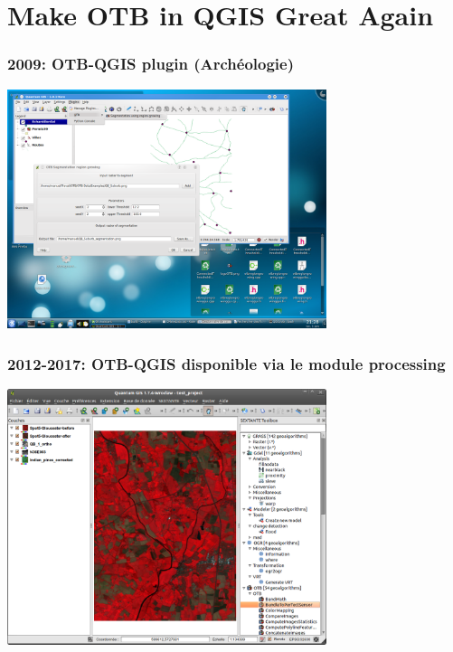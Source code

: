 \documentclass[8pt]{beamer}
\begin{document}
\section{Make OTB in QGIS Great Again}

\begin{frame}
\frametitle{2009: OTB-QGIS plugin (Archéologie)}
\begin{minipage}[t][6cm][t]{\textwidth}
\begin{center}
\includegraphics[width=0.7\textwidth]{images/otb-qgis-2009.png}
\end{center}
\end{minipage}
\end{frame}

\begin{frame}
\frametitle{2012-2017: OTB-QGIS disponible via le module processing}
\begin{minipage}[t][6cm][t]{\textwidth}
\begin{center}
\includegraphics[width=0.7\textwidth]{images/otb_qgis.png}
\end{center}
\end{minipage}
\end{frame}
\end{document}
